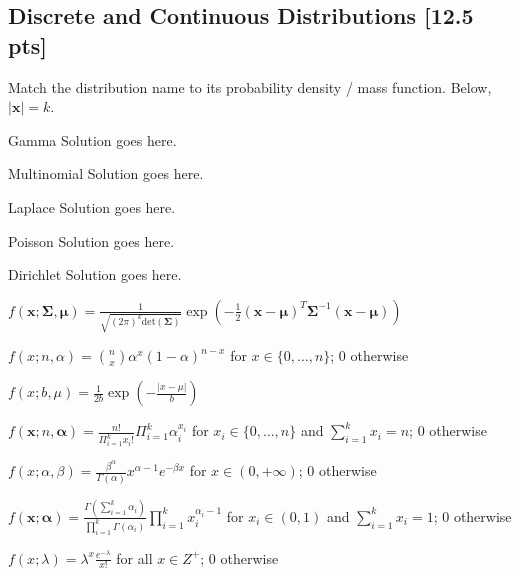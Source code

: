 \documentclass[a4paper]{article}
\theoremstyle{definition}
\newcommand{\vc}[1]{\boldsymbol{#1}}
\newcommand{\xv}{\vc{x}}
\newcommand{\Sigmav}{\vc{\Sigma}}
\newcommand{\alphav}{\vc{\alpha}}
\newcommand{\muv}{\vc{\mu}}
\newenvironment{soln}{
	\leavevmode\color{blue}\ignorespaces
}{}
\begin{document}
	\subsection{Discrete and Continuous Distributions [12.5 pts]}
	Match the distribution name to its probability density / mass
	function. Below, $|\xv| = k$.
	\begin{enumerate}[(a)]
		\begin{minipage}{0.3\linewidth}
			\item Gamma \begin{soln}  Solution goes here. \end{soln}
			\item Multinomial  \begin{soln}  Solution goes here. \end{soln}
			\item Laplace \begin{soln}  Solution goes here. \end{soln}
			\item Poisson \begin{soln}  Solution goes here. \end{soln}
			\item Dirichlet  \begin{soln}  Solution goes here. \end{soln}
			
		\end{minipage}
		\begin{minipage}{0.5\linewidth}
			\item $f(\xv; \Sigmav, \muv) = \frac{1}{\sqrt{(2\pi)^k \mathrm{det}(\Sigmav) }} \exp\left( -\frac{1}{2}
			(\xv - \muv)^T \Sigmav^{-1} (\xv - \muv)  \right)$
			\item $f(x; n, \alpha) = \binom{n}{x} \alpha^x (1 - \alpha)^{n-x}$
			for $x \in \{0,\ldots, n\}$; $0$ otherwise
			\item $f(x; b, \mu) = \frac{1}{2b} \exp\left( - \frac{|x - \mu|}{b} \right)$
			\item $f(\xv; n, \alphav) = \frac{n!}{\Pi_{i=1}^k x_i!}
			\Pi_{i=1}^k \alpha_i^{x_i}$ for $x_i \in \{0,\ldots,n\}$ and
			$\sum_{i=1}^k x_i = n$; $0$ otherwise
			\item $f(x; \alpha, \beta) = \frac{\beta^{\alpha}}{\Gamma(\alpha)} x^{\alpha -
				1}e^{-\beta x}$ for $x \in (0,+\infty)$; $0$ otherwise
			\item $f(\xv; \alphav) = \frac{\Gamma(\sum_{i=1}^k
				\alpha_i)}{\prod_{i=1}^k \Gamma(\alpha_i)} \prod_{i=1}^{k}
			x_i^{\alpha_i - 1}$ for $x_i \in (0,1)$ and $\sum_{i=1}^k x_i =
			1$; 0 otherwise
			\item $f(x; \lambda) = \lambda^x \frac{e^{-\lambda}}{x!}$ for all
			$x \in Z^+$; $0$ otherwise
		\end{minipage}
	\end{enumerate}
	
\end{document}
